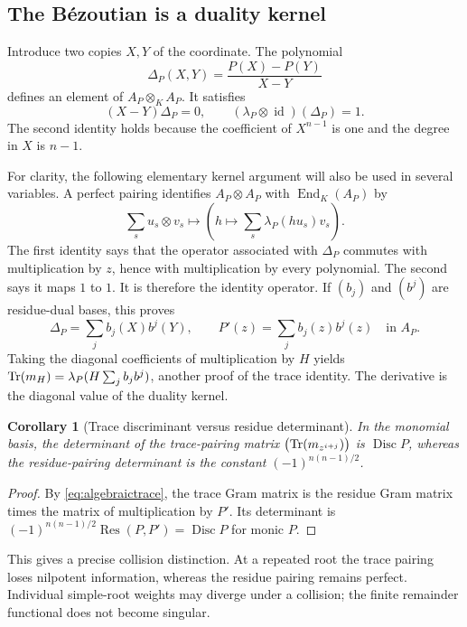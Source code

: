 \documentclass[11pt,letterpaper,oneside]{article}
\numberwithin{equation}{section}
\newtheorem{corollary}[theorem]{Corollary}
\theoremstyle{definition}
\theoremstyle{remark}\newtheorem{remark}[theorem]{Remark}
\newcommand{\Res}{\operatorname{Res}}\newcommand{\Disc}{\operatorname{Disc}}
\newcommand{\id}{\operatorname{id}}\newcommand{\re}{\operatorname{Re}}
\begin{document}
\subsection{The B\'ezoutian is a duality kernel}
Introduce two copies $X,Y$ of the coordinate. The polynomial
\begin{equation}\label{eq:unibezout}
 \Delta_P(X,Y)=\frac{P(X)-P(Y)}{X-Y}
\end{equation}
defines an element of $A_P\otimes_K A_P$. It satisfies
\[
 (X-Y)\Delta_P=0,\qquad
 (\lambda_P\otimes\id)(\Delta_P)=1.
\]
The second identity holds because the coefficient of $X^{n-1}$ is one
and the degree in $X$ is $n-1$.

For clarity, the following elementary kernel argument will also be used
in several variables. A perfect pairing identifies $A_P\otimes A_P$
with $\operatorname{End}_K(A_P)$ by
\begin{equation}\label{eq:kernelmap}
 \sum_su_s\otimes v_s\longmapsto
 \left(h\longmapsto\sum_s\lambda_P(hu_s)v_s\right).
\end{equation}
The first identity says that the operator associated with $\Delta_P$
commutes with multiplication by $z$, hence with multiplication by every
polynomial. The second says it maps $1$ to $1$. It is therefore the
identity operator. If $(b_j)$ and $(b^j)$ are residue-dual bases, this
proves
\[
 \Delta_P=\sum_jb_j(X)b^j(Y),\qquad
 P'(z)=\sum_jb_j(z)b^j(z)\quad\text{in }A_P.
\]
Taking the diagonal coefficients of multiplication by $H$ yields
$\operatorname{Tr}(m_H)=\lambda_P(H\sum_jb_jb^j)$, another proof of the trace identity.
The derivative is the diagonal value of the duality kernel.

\begin{corollary}[Trace discriminant versus residue determinant]\label{cor:tracegram}
In the monomial basis, the determinant of the trace-pairing matrix
$\bigl(\operatorname{Tr}(m_{z^{i+j}})\bigr)$ is $\Disc P$, whereas the residue-pairing
determinant is the constant $(-1)^{n(n-1)/2}$.
\end{corollary}
\begin{proof}
By \eqref{eq:algebraictrace}, the trace Gram matrix is the residue Gram
matrix times the matrix of multiplication by $P'$. Its determinant is
$(-1)^{n(n-1)/2}\Res(P,P')=\Disc P$ for monic $P$.
\end{proof}
This gives a precise collision distinction. At a repeated root the trace
pairing loses nilpotent information, whereas the residue pairing remains
perfect. Individual simple-root weights may diverge under a collision;
the finite remainder functional does not become singular.
\end{document}
